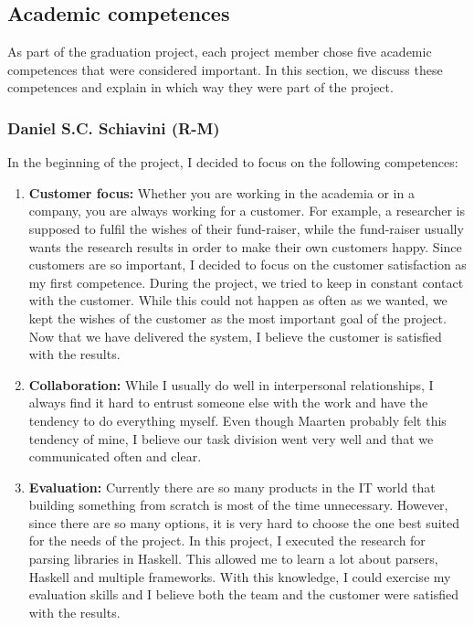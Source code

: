 
\subsection{Academic competences}
\label{assessment:competences}
As part of the graduation project, each project member chose five academic competences that were considered important.
In this section, we discuss these competences and explain in which way they were part of the project.

\subsubsection{Daniel S.C. Schiavini (R-M)}
In the beginning of the project, I decided to focus on the following competences:
\begin{enumerate}
    \item \textbf{Customer focus:}
        Whether you are working in the academia or in a company, you are always working for a customer.
        For example, a researcher is supposed to fulfil the wishes of their fund-raiser, while the fund-raiser usually wants the research results in order to make their own customers happy.
        Since customers are so important, I decided to focus on the customer satisfaction as my first competence.
        During the project, we tried to keep in constant contact with the customer.
        While this could not happen as often as we wanted, we kept the wishes of the customer as the most important goal of the project.
        Now that we have delivered the system, I believe the customer is satisfied with the results.
        
    \item \textbf{Collaboration:}
        While I usually do well in interpersonal relationships, I always find it hard to entrust someone else with the work and have the tendency to do everything myself.
        Even though Maarten probably felt this tendency of mine, I believe our task division went very well and that we communicated often and clear.
    
    \item \textbf{Evaluation:}
        Currently there are so many products in the IT world that building something from scratch is most of the time unnecessary.
        However, since there are so many options, it is very hard to choose the one best suited for the needs of the project.
        In this project, I executed the research for parsing libraries in Haskell.
        This allowed me to learn a lot about parsers, Haskell and multiple frameworks.
        With this knowledge, I could exercise my evaluation skills and I believe both the team and the customer were satisfied with the results.
    

\end{enumerate}
